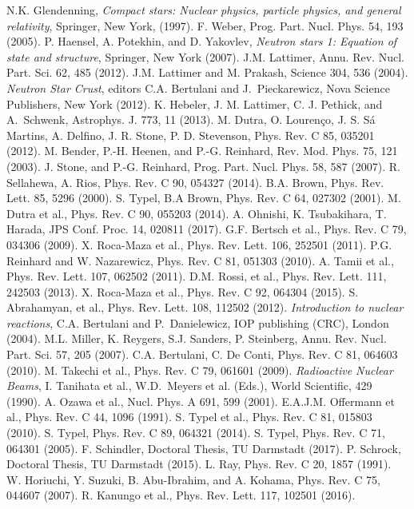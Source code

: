 \documentclass[english,aps,prl,twocolumn,superscriptaddress]{revtex4}
\begin{document}
\begin{thebibliography}{99}
 N.K. Glendenning,  {\it Compact stars: Nuclear physics, particle physics, and general relativity}, Springer, New York, (1997).
 F. Weber, Prog. Part. Nucl. Phys. 54, 193 (2005).
 P. Haensel, A. Potekhin, and D. Yakovlev, {\it Neutron stars 1: Equation of state and structure}, Springer, New York (2007).
 J.M. Lattimer, Annu. Rev. Nucl. Part. Sci. 62, 485 (2012).
 J.M. Lattimer and M. Prakash, Science 304, 536 (2004).
  {\it Neutron Star Crust}, editors C.A. Bertulani and J.~Pieckarewicz, Nova Science Publishers,  New York (2012).
 K. Hebeler, J. M. Lattimer, C. J. Pethick, and A.~Schwenk, Astrophys. J. 773, 11 (2013).
 M. Dutra, O. Louren\c co, J. S. S\'a Martins, A. Delfino, J. R. Stone, P. D. Stevenson, Phys. Rev. C 85, 035201 (2012).
 M. Bender, P.-H. Heenen, and P.-G. Reinhard, Rev. Mod. Phys. 75, 121 (2003).
 J. Stone, and P.-G. Reinhard, Prog. Part. Nucl. Phys. 58, 587 (2007).
 R. Sellahewa, A. Rios, Phys. Rev. C 90, 054327 (2014).
 B.A. Brown, Phys. Rev. Lett. 85, 5296 (2000).
 S. Typel, B.A Brown, Phys. Rev. C 64, 027302 (2001).
 M. Dutra et al., Phys. Rev. C 90, 055203 (2014).
 A. Ohnishi, K.  Tsubakihara, T.  Harada, JPS Conf. Proc. 14, 020811 (2017).
 G.F. Bertsch et al., Phys. Rev. C 79, 034306 (2009).
  X. Roca-Maza et al., Phys. Rev. Lett. 106, 252501 (2011).
 P.G. Reinhard and W. Nazarewicz, Phys. Rev. C 81, 051303 (2010).
 A. Tamii et al., Phys. Rev. Lett. 107, 062502 (2011). 
 D.M. Rossi, et al., Phys. Rev. Lett. 111, 242503 (2013).
 X. Roca-Maza et al., Phys. Rev. C 92, 064304 (2015).
 S. Abrahamyan, et al., Phys. Rev. Lett. 108, 112502 (2012).
 {\it Introduction to nuclear reactions}, C.A. Bertulani and P.~Danielewicz, IOP publishing (CRC), London (2004).
 M.L. Miller, K. Reygers, S.J. Sanders, P. Steinberg, Annu. Rev. Nucl. Part. Sci.  57, 205 (2007).
 C.A. Bertulani, C. De Conti, Phys. Rev. C 81, 064603 (2010).
 M. Takechi et al., Phys. Rev. C 79, 061601 (2009).
 {\it Radioactive Nuclear Beams}, I. Tanihata et al., W.D.~Meyers et al. (Eds.),  World Scientific, 429 (1990).
 A. Ozawa et al., Nucl. Phys. A 691, 599 (2001).
 E.A.J.M. Offermann et al., Phys. Rev. C 44, 1096 (1991).
 S. Typel et al., Phys. Rev. C 81, 015803 (2010).
 S. Typel, Phys. Rev. C 89, 064321 (2014).
 S. Typel, Phys. Rev. C 71, 064301 (2005).
 F. Schindler, Doctoral Thesis, TU Darmstadt (2017).
 P. Schrock, Doctoral Thesis, TU Darmstadt (2015).
 L. Ray, Phys. Rev. C 20, 1857 (1991).
 W. Horiuchi, Y. Suzuki, B. Abu-Ibrahim, and A. Kohama, Phys. Rev. C 75, 044607 (2007). 
 R. Kanungo et al., Phys. Rev. Lett. 117, 102501 (2016).
\end{thebibliography}
\end{document}
